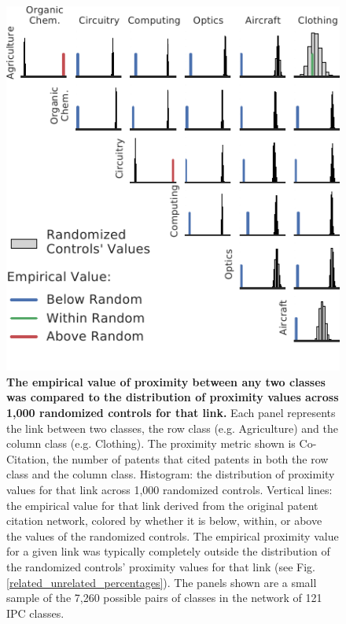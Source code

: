 \documentclass[]{svjour3}
\begin{document}
\begin{figure}[ht!]
\begin{center}
\includegraphics[width=\columnwidth]{figs/Rewiring_Histogram.pdf} 
\end{center}
\caption{\textbf{The empirical value of proximity between any two classes was compared to the distribution of proximity values across 1,000 randomized controls for that link.} Each panel represents the link between two classes, the row class (e.g. Agriculture) and the column class (e.g. Clothing). The proximity metric shown is Co-Citation, the number of patents that cited patents in both the row class and the column class. Histogram: the distribution of proximity values for that link across 1,000 randomized controls. Vertical lines: the empirical value for that link derived from the original patent citation network, colored by whether it is below, within, or above the values of the randomized controls. The empirical proximity value for a given link was typically completely outside the distribution of the randomized controls' proximity values for that link (see Fig. \ref{related_unrelated_percentages}). The panels shown are a small sample of the 7,260 possible pairs of classes in the network of 121 IPC classes.}\label{rewiring_histogram}
\end{figure}
\end{document}
